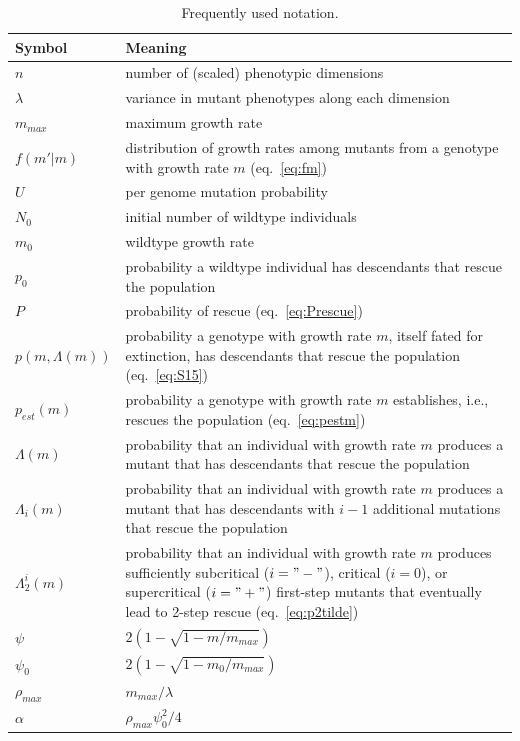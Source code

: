 \documentclass[9pt,twocolumn,twoside,lineno]{gsajnl}
\begin{document}
\begin{table}[!h]
\begin{tabular}{p{1.5cm} p{6.5cm}}
\hline
Symbol & Meaning \\
\hline
\hline
$n$ & number of (scaled) phenotypic dimensions\\
$\lambda$ & variance in mutant phenotypes along each dimension\\
$m_{max}$ & maximum growth rate\\
$f(m'|m)$ & distribution of growth rates among mutants from a genotype with growth rate $m$ (eq.\ \ref{eq:fm})\\
$U$ & per genome mutation probability\\ 
$N_0$ & initial number of wildtype individuals\\
$m_0$ & wildtype growth rate\\
$p_0$ & probability a wildtype individual has descendants that rescue the population\\
$P$ & probability of rescue (eq.\ \ref{eq:Prescue})\\
$p(m,\Lambda(m))$ & probability a genotype with growth rate $m$, itself fated for extinction, has descendants that rescue the population (eq.\ \ref{eq:S15})\\
$p_{est}(m)$ & probability a genotype with growth rate $m$ establishes, i.e., rescues the population (eq.\ \ref{eq:pestm})\\
$\Lambda(m)$ & probability that an individual with growth rate $m$ produces a mutant that has descendants that rescue the population\\
$\Lambda_i(m)$ & probability that an individual with growth rate $m$ produces a mutant that has descendants with $i-1$ additional mutations that rescue the population\\
$\Lambda_2^{i}(m)$ & probability that an individual with growth rate $m$ produces sufficiently subcritical ($i="-"$), critical ($i=0$), or supercritical ($i="+"$) first-step mutants that eventually lead to 2-step rescue (eq.\ \ref{eq:p2tilde}) \\
$\psi$ & $2(1-\sqrt{1-m/m_{max}})$ \\
$\psi_0$ & $2(1-\sqrt{1-m_0/m_{max}})$\\
$\rho_{max}$ & $m_{max}/\lambda$\\
$\alpha$ & $\rho_{max} \psi_0^2/4$\\
\hline
\end{tabular}
\caption{Frequently used notation.}
\label{tab:notation}   
\end{table}
\end{document}
